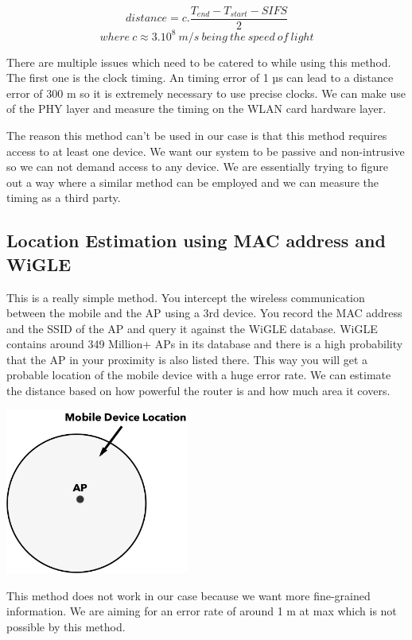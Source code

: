 \documentclass[letterpaper, 10 pt, conference]{ieeeconf}  %
\begin{document}
$$distance =  c.\frac{T_{end}- T_{start} - SIFS}{2}$$
$$where\ c \approx 3.10^8\ m/s\ being\ the\ speed\ of\ light$$

There are multiple issues which need to be catered to while using this method. The first one is the clock timing. An timing error of 1 µs can lead to a distance error of 300 m so it is extremely necessary to use precise clocks. We can make use of the PHY layer and measure the timing on the WLAN card hardware layer.

The reason this method can’t be used in our case is that this method requires access to at least one device. We want our system to be passive and non-intrusive so we can not demand access to any device. We are essentially trying to figure out a way where a similar method can be employed and we can measure the timing as a third party.


\subsection{Location Estimation using MAC address and WiGLE}

This is a really simple method. You intercept the wireless communication between the mobile and the AP using a 3rd device. You record the MAC address and the SSID of the AP and query it against the WiGLE database. WiGLE contains around 349 Million+ APs in its database and there is a high probability that the AP in your proximity is also listed there. This way you will get a probable location of the mobile device with a huge error rate. We can estimate the distance based on how powerful the router is and how much area it covers.

\begin{center}
\includegraphics[width=6cm]{Slice_1.png}
\end{center}

This method does not work in our case because we want more fine-grained information. We are aiming for an error rate of around 1 m at max which is not possible by this method. 
\end{document}
